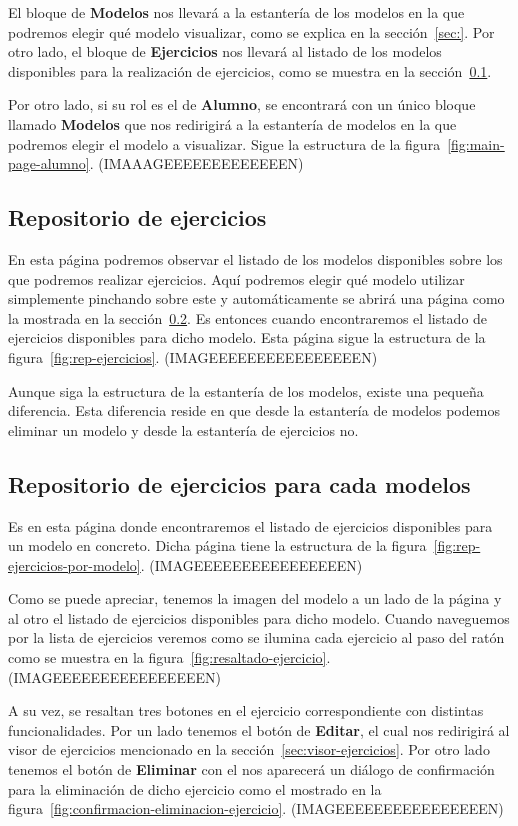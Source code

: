 El bloque de \textbf{Modelos} nos llevará a la estantería de los modelos en la que podremos elegir qué modelo visualizar, como se explica en la sección~\ref{sec:}. Por otro lado, el bloque de \textbf{Ejercicios} nos llevará al listado de los modelos disponibles para la realización de ejercicios, como se muestra en la sección~\ref{sec:rep-ejercicios}.

Por otro lado, si su rol es el de \textbf{Alumno}, se encontrará con un único bloque llamado \textbf{Modelos} que nos redirigirá a la estantería de modelos en la que podremos elegir el modelo a visualizar. Sigue la estructura de la figura~\ref{fig:main-page-alumno}.
(IMAAAGEEEEEEEEEEEEEN)

\subsection{Repositorio de ejercicios}\label{sec:rep-ejercicios}
En esta página podremos observar el listado de los modelos disponibles sobre los que podremos realizar ejercicios. Aquí podremos elegir qué modelo utilizar simplemente pinchando sobre este y automáticamente se abrirá una página como la mostrada en la sección~\ref{sec:rep-ejercicios-modelos}. Es entonces cuando encontraremos el listado de ejercicios disponibles para dicho modelo. Esta página sigue la estructura de la figura~\ref{fig:rep-ejercicios}.
(IMAGEEEEEEEEEEEEEEEEN)

Aunque siga la estructura de la estantería de los modelos, existe una pequeña diferencia. Esta diferencia reside en que desde la estantería de modelos podemos eliminar un modelo y desde la estantería de ejercicios no.

\subsection{Repositorio de ejercicios para cada modelos}\label{sec:rep-ejercicios-modelos}
Es en esta página donde encontraremos el listado de ejercicios disponibles para un modelo en concreto. Dicha página tiene la estructura de la figura~\ref{fig:rep-ejercicios-por-modelo}.
(IMAGEEEEEEEEEEEEEEEEN)

Como se puede apreciar, tenemos la imagen del modelo a un lado de la página y al otro el listado de ejercicios disponibles para dicho modelo. Cuando naveguemos por la lista de ejercicios veremos como se ilumina cada ejercicio al paso del ratón como se muestra en la figura~\ref{fig:resaltado-ejercicio}.
(IMAGEEEEEEEEEEEEEEEEN)

A su vez, se resaltan tres botones en el ejercicio correspondiente con distintas funcionalidades. Por un lado tenemos el botón de \textbf{Editar}, el cual nos redirigirá al visor de ejercicios mencionado en la sección~\ref{sec:visor-ejercicios}. Por otro lado tenemos el botón de \textbf{Eliminar} con el nos aparecerá un diálogo de confirmación para la eliminación de dicho ejercicio como el mostrado en la figura~\ref{fig:confirmacion-eliminacion-ejercicio}.
(IMAGEEEEEEEEEEEEEEEEN)


